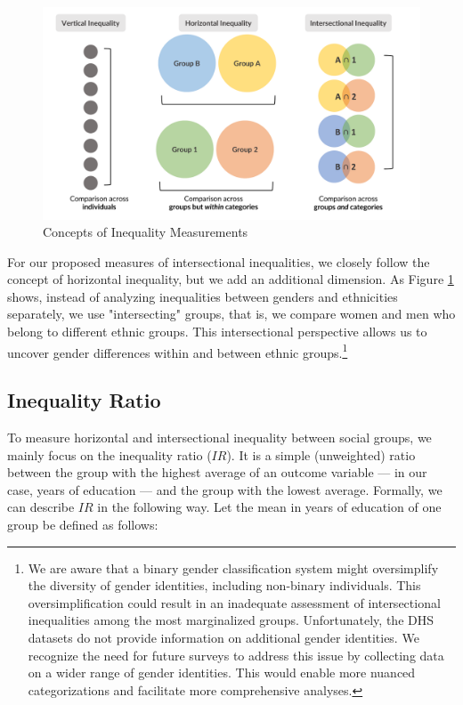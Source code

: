 \begin{figure}[htb]
\includegraphics{figures/intersectionality_framework.pdf} \caption[Concepts of Inequality Measurement]{Concepts of Inequality Measurements}\label{fig:intersectionality-framework}
\end{figure}

For our proposed measures of intersectional inequalities, we closely follow the concept of horizontal inequality, but we add an additional dimension. As Figure \ref{fig:intersectionality-framework} shows, instead of analyzing inequalities between genders and ethnicities separately, we use "intersecting" groups, that is, we compare women and men who belong to different ethnic groups. This intersectional perspective allows us to uncover gender differences within and between ethnic groups.\footnote{We are aware that a binary gender classification system might oversimplify the diversity of gender identities, including non-binary individuals. This oversimplification could result in an inadequate assessment of intersectional inequalities among the most marginalized groups. Unfortunately, the DHS datasets do not provide information on additional gender identities. We recognize the need for future surveys to address this issue by collecting data on a wider range of gender identities. This would enable more nuanced categorizations and facilitate more comprehensive analyses.}

\hypertarget{inequality-ratio.}{%
\subsection{Inequality Ratio}\label{inequality-ratio.}}

To measure horizontal and intersectional inequality between social groups, we mainly focus on the inequality ratio ($IR$). It is a simple (unweighted) ratio between the group with the highest average of an outcome variable --- in our case, years of education --- and the group with the lowest average. Formally, we can describe $IR$ in the following way. Let the mean in years of education of one group be defined as follows:

